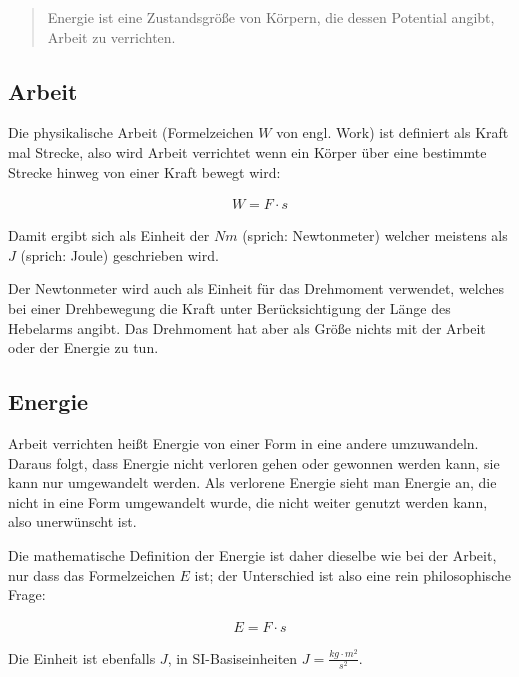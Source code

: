 \begin{quote}
\glqq Energie ist eine Zustandsgröße von Körpern, die dessen Potential angibt, Arbeit zu verrichten.\grqq
\end{quote}

\subsection{Arbeit} \label{subsec:Arbeit}

Die physikalische \glqq Arbeit\grqq{} (Formelzeichen $W$ von engl. \glqq Work\grqq ) ist definiert als Kraft mal Strecke, also wird Arbeit verrichtet wenn ein Körper über eine bestimmte Strecke hinweg von einer Kraft bewegt wird:

\begin{align} \label{eq:Arbeit}
	W = F \cdot s
\end{align}

\noindent Damit ergibt sich als Einheit der $Nm$ (sprich: \glqq Newtonmeter\grqq ) welcher meistens als $J$ (sprich: \glqq Joule\grqq ) geschrieben wird.

\begin{Anmerkung}
Der Newtonmeter wird auch als Einheit für das Drehmoment verwendet, welches bei einer Drehbewegung die Kraft unter Berücksichtigung der Länge des Hebelarms angibt. Das Drehmoment hat aber als Größe nichts mit der Arbeit oder der Energie zu tun.
\end{Anmerkung}


\subsection{Energie}

\glqq Arbeit verrichten\grqq{} heißt Energie von einer Form in eine andere umzuwandeln. Daraus folgt, dass Energie nicht verloren gehen oder gewonnen werden kann, sie kann nur umgewandelt werden. Als \glqq verlorene Energie\grqq{} sieht man Energie an, die nicht in eine Form umgewandelt wurde, die nicht weiter genutzt werden kann, also unerwünscht ist.

Die mathematische Definition der Energie ist daher dieselbe wie bei der Arbeit, nur dass das Formelzeichen $E$ ist; der Unterschied ist also eine rein philosophische Frage:

\begin{align}	\label{eq:energiedef}
	E = F \cdot s
\end{align}

\noindent Die Einheit ist ebenfalls $J$, in SI-Basiseinheiten $J=\frac{kg \cdot m^2}{s^2}$.


